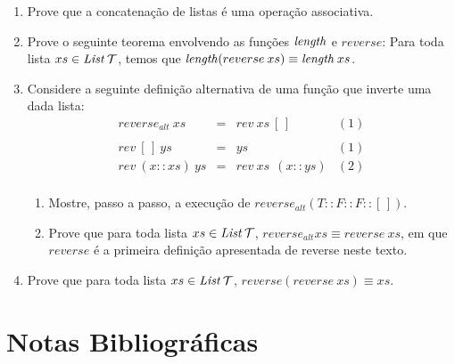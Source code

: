 \begin{enumerate}
  \item Prove que a concatenação de listas é uma operação associativa.
  \item Prove o seguinte teorema envolvendo as funções $\textit{length\/}$ e
    $reverse$: Para toda lista $xs \in \textit{List\/}\,\mathcal{T}$, temos que
    $\textit{length\/}(reverse \:xs)\equiv \textit{length\/}\:xs$.
 \item Considere a seguinte definição alternativa de uma função que
   inverte uma dada lista:
\[
\begin{array}{lclc}
  reverse_{alt}\:xs & = & rev\: xs \: [\,] & (1)\\
   & \\
  rev \: [\,] \: ys & = & ys & (1) \\
  rev \: (x :: xs) \: ys & = & rev \: xs \:\:(x :: ys) & (2)\\
\end{array}
\]
 \begin{enumerate}
   \item Mostre, passo a passo, a execução de $reverse_{alt}(T :: F ::
     F :: [\,])$.
   \item Prove que para toda lista $xs \in \textit{List\/}\,\mathcal{T}$,
     $reverse_{alt}xs \equiv reverse\: xs$, em que $reverse$ é a
     primeira definição apresentada de reverse neste texto.
  \end{enumerate}
  \item Prove que para toda lista $xs\in\textit{List\/}\,\mathcal{T}$,
    $reverse(reverse\:xs) \equiv xs$.
\end{enumerate}





\section{Notas Bibliográficas}
